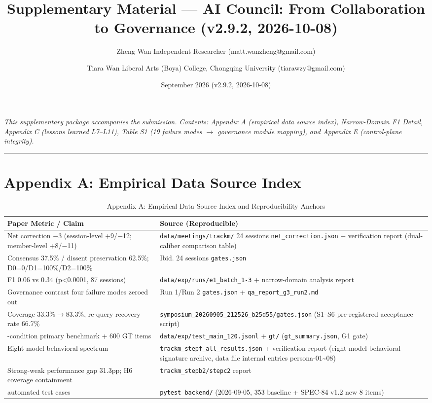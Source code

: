 \documentclass[11pt,a4paper]{article}
\title{Supplementary Material --- AI Council: From Collaboration to Governance (v2.9.2, 2026-10-08)}
\author{Zheng Wan \quad Independent Researcher (matt.wanzheng@gmail.com) \\ \and Tiara Wan \quad Liberal Arts (Boya) College, Chongqing University (tiarawzy@gmail.com)}
\date{September 2026 (v2.9.2, 2026-10-08)}
\begin{document}
\maketitle



\emph{This supplementary package accompanies the submission. Contents: Appendix A (empirical data source index), Narrow-Domain F1 Detail, Appendix C (lessons learned L7--L11), Table S1 (19 failure modes $\rightarrow$ governance module mapping), and Appendix E (control-plane integrity).}

\begin{center}\rule{0.5\linewidth}{0.5pt}\end{center}

\section*{Appendix A: Empirical Data Source Index}


\begin{table}[htbp]
\caption{Appendix A: Empirical Data Source Index and Reproducibility Anchors}
\centering
\small
\begin{tabularx}{\textwidth}{>{\raggedright\arraybackslash}p{6cm}>{\raggedright\arraybackslash}X}
\toprule
Paper Metric / Claim
& Source (Reproducible)
\\
\midrule
Net correction $-$3 (session-level +9/$-$12; member-level +8/$-$11) & \texttt{data/meetings/trackm/} 24 sessions \texttt{net\_correction.json} + verification report (dual-caliber comparison table) \\
Consensus 37.5\% / dissent preservation 62.5\%; D0=0/D1=100\%/D2=100\% & Ibid. 24 sessions \texttt{gates.json} \\
F1 0.06 vs 0.34 (p\textless0.0001, 87 sessions) & \texttt{data/exp/runs/e1\_batch\_1-3} + narrow-domain analysis report \\
Governance contrast four failure modes zeroed out & Run 1/Run 2 \texttt{gates.json} + \texttt{qa\_report\_g3\_run2.md} \\
Coverage 33.3\%$\rightarrow$83.3\%, re-query recovery rate 66.7\% & \texttt{symposium\_20260905\_212526\_b25d55/gates.json} (S1--S6 pre-registered acceptance script) \\
120-condition primary benchmark + 600 GT items & \texttt{data/exp/test\_main\_120.jsonl} + \texttt{gt/} (\texttt{gt\_summary.json}, G1 gate) \\
Eight-model behavioral spectrum & \texttt{trackm\_stepf\_all\_results.json} + verification report (eight-model behavioral signature archive, data file internal entries persona-01\textasciitilde08) \\
Strong-weak performance gap 31.3pp; H6 coverage containment & \texttt{trackm\_stepb2/stepc2} report \\
361 automated test cases & \texttt{pytest\ backend/} (2026-09-05, 353 baseline + SPEC-84 v1.2 new 8 items) \\
\bottomrule
\end{tabularx}
\end{table}
\end{document}
